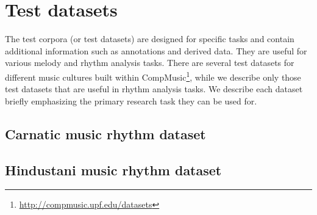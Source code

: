\section{Test datasets}
The test corpora (or test datasets) are designed for specific tasks and contain additional information such as annotations and derived data. They are useful for various melody and rhythm analysis tasks. There are several test datasets for different music cultures built within CompMusic\footnote{\url{http://compmusic.upf.edu/datasets}}, while we describe only those test datasets that are useful in rhythm analysis tasks. We describe each dataset briefly emphasizing the primary research task they can be used for. 
\subsection{Carnatic music rhythm dataset}\label{sec:cmrdataset}

%
\subsection{Hindustani music rhythm dataset}\label{sec:hmrdataset}

%
